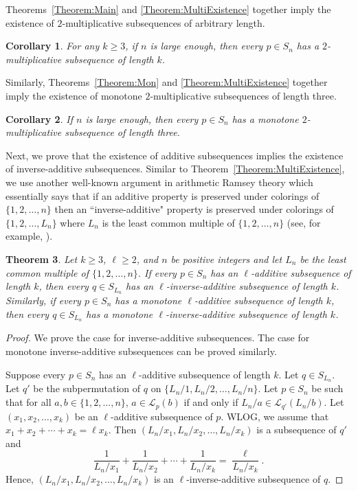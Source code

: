 \documentclass[10pt,a4paper]{amsart}
\newtheorem{theorem}{Theorem}[section]
\newtheorem{corollary}[theorem]{Corollary}
\begin{document}
Theorems~\ref{Theorem:Main} and \ref{Theorem:MultiExistence} together imply the existence of $2$-multiplicative subsequences of arbitrary length.

\begin{corollary}
    For any $k\geq3$, if $n$ is large enough, then every $p\in S_n$ has a $2$-multiplicative subsequence of length $k$.
\end{corollary}

Similarly, Theorems~\ref{Theorem:Mon} and \ref{Theorem:MultiExistence} together imply the existence of monotone $2$-multiplicative subsequences of length three.

\begin{corollary}
    If $n$ is large enough, then every $p\in S_n$ has a monotone $2$-multiplicative subsequence of length three.
\end{corollary}

Next, we prove that the existence of additive subsequences implies the existence of inverse-additive subsequences. Similar to Theorem~\ref{Theorem:MultiExistence}, we use another well-known argument in arithmetic Ramsey theory which essentially says that if an additive property is preserved under colorings of $\{1,2,\ldots,n\}$ then an ``inverse-additive" property is preserved under colorings of $\{1,2,\ldots,L_n\}$ where $L_n$ is the least common multiple of $\{1,2,\ldots,n\}$ (see, for example, \cite{BrownRodl1991,Gaiser2024,Lefmann1991}).
\begin{theorem}\label{Theorem:InverseExistence}
Let $k\geq3$, $\ell\geq2$, and $n$ be positive integers and let $L_n$ be the least common multiple of $\{1,2,\ldots,n\}$. If every $p\in S_n$ has an $\ell$-additive subsequence of length $k$, then every $q\in S_{L_n}$ has an $\ell$-inverse-additive subsequence of length $k$. Similarly, if every $p\in S_n$ has a monotone $\ell$-additive subsequence of length $k$, then every $q\in S_{L_n}$ has a monotone $\ell$-inverse-additive subsequence of length $k$.
\end{theorem}
\begin{proof}
We prove the case for inverse-additive subsequences. The case for monotone inverse-additive subsequences can be proved similarly.

Suppose every $p\in S_n$ has an $\ell$-additive subsequence of length $k$. Let $q\in S_{L_n}$. Let $q'$ be the subpermutation of $q$ on $\{L_n/1,L_n/2,\ldots,L_n/n\}$. Let $p\in S_n$ be such that for all $a,b\in\{1,2,\ldots,n\}$, $a\in\mathcal{L}_{p}(b)$ if and only if $L_n/a\in\mathcal{L}_{q'}(L_n/b)$. Let $(x_1,x_2,\ldots,x_k)$ be an $\ell$-additive subsequence of $p$. WLOG, we assume that $x_1+x_2+\cdots+x_k=\ell x_k$. Then $(L_n/x_1,L_n/x_2,\ldots,L_n/x_k)$ is a subsequence of $q'$ and
\[
\frac{1}{L_n/x_1}+\frac{1}{L_n/x_2}+\cdots+\frac{1}{L_n/x_k}=\frac{\ell}{L_n/x_k}.
\]
Hence, $(L_n/x_1,L_n/x_2,\ldots,L_n/x_k)$ is an $\ell$-inverse-additive subsequence of $q$.
\end{proof}
\end{document}
